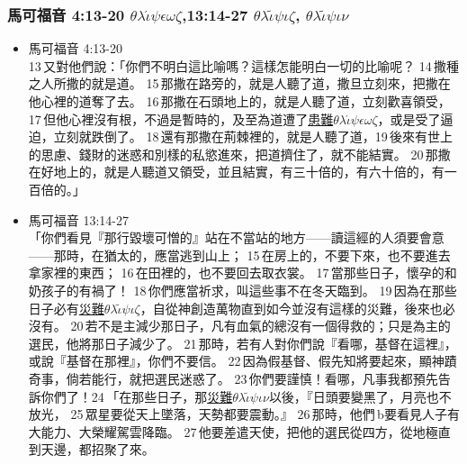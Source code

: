 \begin{itemize}
\end{itemize}   
    
 \subsubsection{馬可福音 4:13-20 $\theta$$\lambda$$\acute{\iota}$$\psi$$\epsilon$$\omega$$\zeta$,13:14-27 $\theta$$\lambda$$\tilde{\iota}$$\psi$$\iota$$\zeta$, $\theta$$\lambda$$\tilde{\iota}$$\psi$$\iota$$\nu$} 
 \begin{itemize} 
\itemsep-.25em
\item {馬可福音 4:13-20}\\
13 又對他們說：「你們不明白這比喻嗎？這樣怎能明白一切的比喻呢？ 14 撒種之人所撒的就是道。 15 那撒在路旁的，就是人聽了道，撒旦立刻來，把撒在他心裡的道奪了去。 16 那撒在石頭地上的，就是人聽了道，立刻歡喜領受， 17 但他心裡沒有根，不過是暫時的，及至為道遭了\underline{患難$\theta$$\lambda$$\acute{\iota}$$\psi$$\epsilon$$\omega$$\zeta$}，或是受了逼迫，立刻就跌倒了。 18 還有那撒在荊棘裡的，就是人聽了道，19 後來有世上的思慮、錢財的迷惑和別樣的私慾進來，把道擠住了，就不能結實。 20 那撒在好地上的，就是人聽道又領受，並且結實，有三十倍的，有六十倍的，有一百倍的。」
\item{馬可福音 13:14-27}   \\
「你們看見『那行毀壞可憎的』站在不當站的地方——讀這經的人須要會意——那時，在猶太的，應當逃到山上； 15 在房上的，不要下來，也不要進去拿家裡的東西； 16 在田裡的，也不要回去取衣裳。 17 當那些日子，懷孕的和奶孩子的有禍了！ 18 你們應當祈求，叫這些事不在冬天臨到。 19 因為在那些日子必有\underline{災難$\theta$$\lambda$$\tilde{\iota}$$\psi$$\iota$$\zeta$}，自從神創造萬物直到如今並沒有這樣的災難，後來也必沒有。 20 若不是主減少那日子，凡有血氣的總沒有一個得救的；只是為主的選民，他將那日子減少了。 21 那時，若有人對你們說『看哪，基督在這裡』，或說『基督在那裡』，你們不要信。 22 因為假基督、假先知將要起來，顯神蹟奇事，倘若能行，就把選民迷惑了。 23 你們要謹慎！看哪，凡事我都預先告訴你們了！24 「在那些日子，那\underline{災難$\theta$$\lambda$$\tilde{\iota}$$\psi$$\iota$$\nu$}以後，『日頭要變黑了，月亮也不放光， 25 眾星要從天上墜落，天勢都要震動。』 26 那時，他們 b要看見人子有大能力、大榮耀駕雲降臨。 27 他要差遣天使，把他的選民從四方，從地極直到天邊，都招聚了來。  
\end{itemize}  


